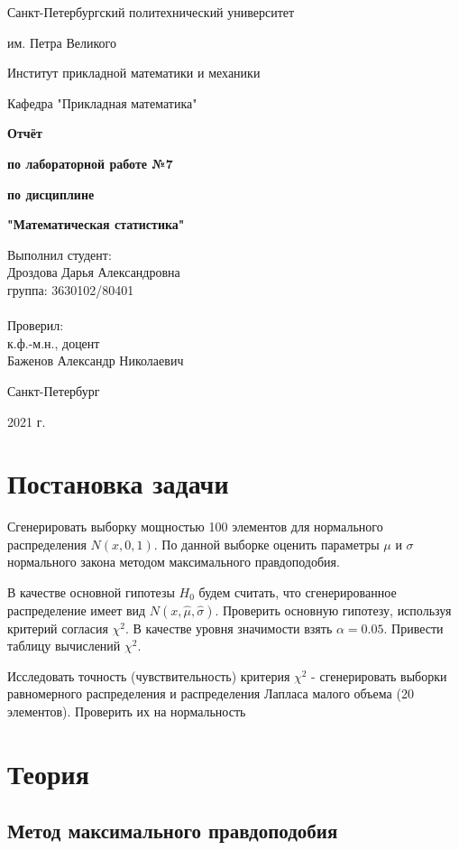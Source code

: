 \documentclass[a4paper, 12pt]{article}
\begin{document}
\begin{titlepage}
  \thispagestyle{empty}
  \centerline {Санкт-Петербургский политехнический университет}
  \centerline { им. Петра Великого}
  \centerline { }
  \centerline {Институт прикладной математики и механики} 
  \centerline {Кафедра "Прикладная математика"}
  \vfill
  \centerline{\textbf{Отчёт}}
  \centerline{\textbf{по лабораторной работе №7}}
  \centerline{\textbf{по дисциплине}}
  \centerline{\textbf{"Математическая статистика"}}
  \vfill
  \hfill
  \begin{minipage}{0.45\textwidth}
  Выполнил студент:\\
  Дроздова Дарья Александровна\\
  группа: 3630102/80401 \\
  \\
  Проверил:\\
  к.ф.-м.н., доцент \\
  Баженов Александр Николаевич
  \end{minipage}
  \vfill
  \centerline {Санкт-Петербург}   
  \centerline {2021 г.}  
\end{titlepage}

\newpage
\setcounter{page}{2}
\tableofcontents

\newpage
\listoftables

\newpage
\section{Постановка задачи}

Сгенерировать выборку мощностью 100 элементов для нормального распределения $N(x,0,1)$. По данной выборке оценить параметры $\mu$ и $\sigma$ нормального закона методом максимального правдоподобия.

В качестве основной гипотезы $H_0$ будем считать, что сгенерированное распределение имеет вид $N(x, \widehat{\mu}, \widehat{\sigma})$. Проверить основную гипотезу, используя критерий согласия $\chi^2$. В качестве уровня значимости взять $\alpha=0.05$. Привести таблицу вычислений $\chi^2$.

Исследовать точность (чувствительность) критерия $\chi^2$ - сгенерировать выборки равномерного распределения и распределения Лапласа малого объема (20 элементов). Проверить их на нормальность

\newpage
\section{Теория}
\subsection{Метод максимального правдоподобия}
\end{document}
